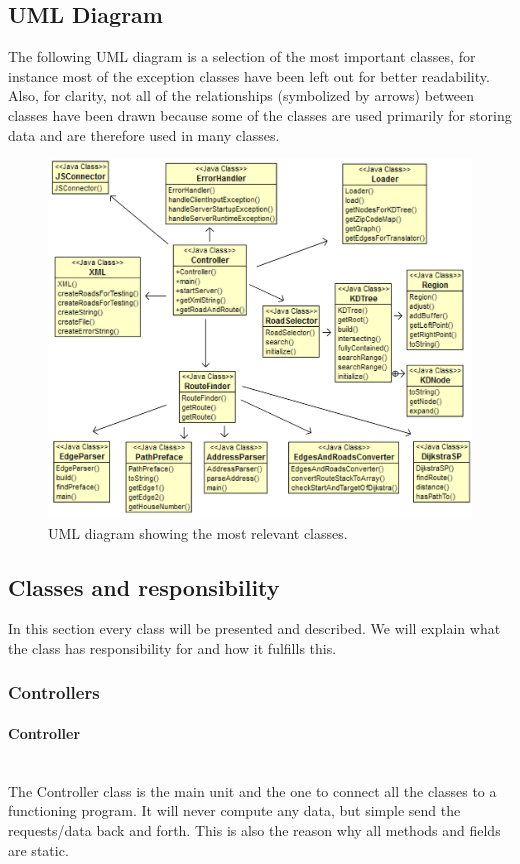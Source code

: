 \documentclass[a4paper,10pt,titlepage]{article}
\begin{document}
		\subsection{UML Diagram}
		The following UML diagram is a selection of the most important classes, for instance most of the exception classes have been left out for better readability. Also, for clarity, not all of the relationships (symbolized by arrows) between classes have been drawn because some of the classes are used primarily for storing data and are therefore used in many classes. 
		\begin{figure}[H]
\includegraphics[width=120mm]{umlArrows.png}
\caption{UML diagram showing the most relevant classes.}
\label{fig:uml}
\end{figure}
		
		\newpage
		\subsection{Classes and responsibility}
		In this section every class will be presented and described. We will explain what the class has responsibility  for and how it fulfills this. 

			
			\subsubsection{Controllers}
			
				\paragraph{Controller}\mbox{}\\
The Controller class is the main unit and the one to connect all the classes to a functioning program. It will never compute any data, but simple send the requests/data back and forth.  This is also the reason why all methods and fields are static.
\end{document}
